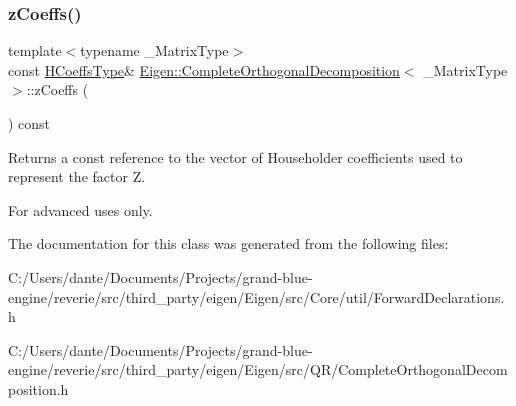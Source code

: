 \subsubsection{\texorpdfstring{zCoeffs()}{zCoeffs()}}
{\footnotesize\ttfamily template$<$typename \+\_\+\+Matrix\+Type$>$ \\
const \mbox{\hyperlink{struct_eigen_1_1internal_1_1true__type}{H\+Coeffs\+Type}}\& \mbox{\hyperlink{class_eigen_1_1_complete_orthogonal_decomposition}{Eigen\+::\+Complete\+Orthogonal\+Decomposition}}$<$ \+\_\+\+Matrix\+Type $>$\+::z\+Coeffs (\begin{DoxyParamCaption}{ }\end{DoxyParamCaption}) const\hspace{0.3cm}{\ttfamily [inline]}}

\begin{DoxyReturn}{Returns}
a const reference to the vector of Householder coefficients used to represent the factor {\ttfamily Z}.
\end{DoxyReturn}
For advanced uses only. 

The documentation for this class was generated from the following files\+:\begin{DoxyCompactItemize}
\item 
C\+:/\+Users/dante/\+Documents/\+Projects/grand-\/blue-\/engine/reverie/src/third\+\_\+party/eigen/\+Eigen/src/\+Core/util/Forward\+Declarations.\+h\item 
C\+:/\+Users/dante/\+Documents/\+Projects/grand-\/blue-\/engine/reverie/src/third\+\_\+party/eigen/\+Eigen/src/\+Q\+R/Complete\+Orthogonal\+Decomposition.\+h\end{DoxyCompactItemize}

